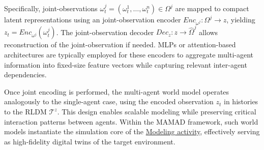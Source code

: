 Specifically, joint-observations $\omega_t^{j} = (\omega_t^1, \dots, \omega_t^n) \in \Omega^{j}$ are mapped to compact latent representations using an joint-observation encoder $Enc_{\omega^j}: \Omega^{j} \rightarrow z$, yielding $z_t = Enc_{\omega^j}(\omega_t^{j})$. The joint-observation decoder $Dec_{z}: z \rightarrow \hat{\Omega}^{j}$ allows reconstruction of the joint-observation if needed.
%
MLPs or attention-based architectures are typically employed for these encoders to aggregate multi-agent information into fixed-size feature vectors while capturing relevant inter-agent dependencies.

Once joint encoding is performed, the multi-agent world model operates analogously to the single-agent case, using the encoded observation $z_t$ in histories to the RLDM $\mathcal{T}^{z}$. This design enables scalable modeling while preserving critical interaction patterns between agents. Within the MAMAD framework, such world models instantiate the simulation core of the \hyperref[sec:modelling]{Modeling activity}, effectively serving as high-fidelity digital twins of the target environment.

\

